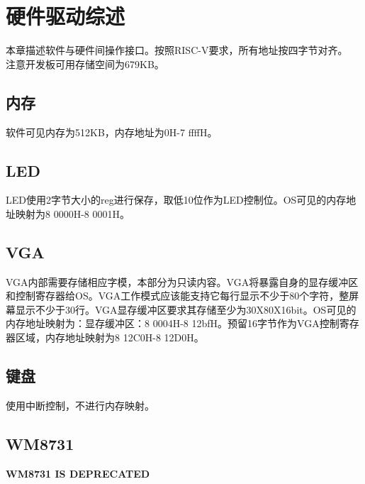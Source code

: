 %
% 
% 
% 
% 
% 
% 
%

\chapter{硬件驱动综述}
本章描述软件与硬件间操作接口。按照RISC-V要求，所有地址按四字节对齐。\\
注意开发板可用存储空间为679KB。
\section{内存}
软件可见内存为512KB，内存地址为0H-7 ffffH。
\section{LED}
LED使用2字节大小的reg进行保存，取低10位作为LED控制位。OS可见的内存地址映射为8 0000H-8 0001H。
\section{VGA}
VGA内部需要存储相应字模，本部分为只读内容。VGA将暴露自身的显存缓冲区和控制寄存器给OS。VGA工作模式应该能支持它每行显示不少于80个字符，整屏幕显示不少于30行。VGA显存缓冲区要求其存储至少为30X80X16bit。OS可见的内存地址映射为：显存缓冲区：8 0004H-8 12bfH。预留16字节作为VGA控制寄存器区域，内存地址映射为8 12C0H-8 12D0H。
\section{键盘}
使用中断控制，不进行内存映射。
\section{WM8731}
\textbf{WM8731 IS DEPRECATED}
